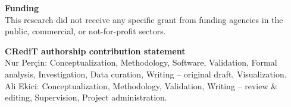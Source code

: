 \documentclass[11pt]{article}
\begin{document}
\vspace{1.5em}

\noindent\textbf{Funding}\\
This research did not receive any specific grant from funding agencies in the public, commercial, or not-for-profit sectors.

\vspace{1.5em}

\noindent\textbf{CRediT authorship contribution statement}\\
Nur Per\c{c}in: Conceptualization, Methodology, Software, Validation, Formal analysis, Investigation, Data curation, Writing -- original draft, Visualization.\\
Ali Ekici: Conceptualization, Methodology, Validation, Writing -- review \& editing, Supervision, Project administration.
\end{document}
